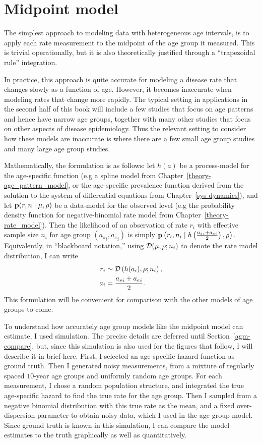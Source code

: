 \section{Midpoint model}

The simplest approach to modeling data with heterogeneous age
intervals, is to apply each rate measurement to the midpoint of the
age group it measured.  This is trivial operationally, but it is also
theoretically justified through a ``trapezoidal rule'' integration.

In practice, this approach is quite accurate for modeling a
disease rate that changes slowly as a function of age.  However, it
becomes inaccurate when modeling rates that change more
rapidly.  The typical setting in applications in the second half of
this book will include a few studies that focus on age patterns and
hence have narrow age groups, together with many other studies
that focus on other aspects of disease epidemiology.  Thus the
relevant setting to consider how these models are inaccurate is where
there are a few small age group studies and many large age group
studies.

Mathematically, the formulation is as follows: let $h(a)$ be a
process-model for the age-specific function (e.g a spline model
from Chapter~\ref{theory-age_pattern_model}, or the age-specific prevalence function derived from the solution to the system of differential equations from Chapter~\ref{sys-dynamics}), and let $\mathbf{p}(r,n\;|\;
\mu,\rho)$ be a data-model for the observed level (e.g the probability
density function for negative-binomial rate model from
Chapter~\ref{theory-rate_model}).
Then the likelihood of an observation of rate $r_i$ with effective
sample size $n_i$ for age group $({a_s}_i, {a_e}_i)$ is simply
$\mathbf{p}\left(r_i, n_i \;|\; h\left(\frac{{a_s}_i+{a_e}_i}{2}\right),
\rho\right)$. Equivalently, in ``blackboard notation,'' using
$\mathcal{D}(\mu, \rho; n_i)$ to denote the rate model distribution, I can
write
\begin{align*}
r_i &\sim \mathcal{D}\left(h(a_i), \rho; n_i\right),\\
a_i &= \frac{{a_s}_i+{a_e}_i}{2}.
\end{align*}
This formulation will be convenient for comparison with the other models of age groups to come.

To understand how accurately age group models like the midpoint model
can estimate, I used simulation.  The precise details are deferred
until Section~\ref{agm-compare}, but, since this simulation is also used for the
figures that follow, I will describe it in brief here.  First, I
selected an age-specific hazard function as ground truth.  Then I
generated noisy measurements, from a mixture of regularly spaced
$10$-year age groups and uniformly random age groups.  For each
measurement, I chose a random population structure, and integrated the
true age-specific hazard to find the true rate for the age group.
Then I sampled from a negative binomial distribution with this true
rate as the mean, and a fixed over-dispersion parameter to obtain noisy
data, which I used in the age group model.  Since ground truth is
known in this simulation, I can compare the model estimates to the
truth graphically as well as quantitatively.

